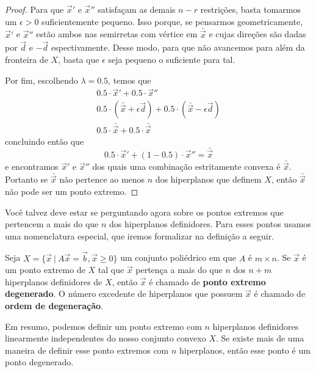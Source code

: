 \begin{thm:ponto extremo}
\begin{proof}
		Para que $\vec{x}'$ e $\vec{x}''$ satisfaçam as demais $n - r$ restrições,
		basta tomarmos um $\epsilon > 0$ suficientemente pequeno. Isso porque, se
		pensarmos geometricamente,  $\vec{x}'$ e $\vec{x}''$ estão ambos nas semirretas
		com vértice em $\bar{\vec{x}}$ e cujas direções são dadas por $\vec{d}$ e $-\vec{d}$
		espectivamente. Desse modo, para que não avancemos para além da fronteira de $X$,
		basta que $\epsilon$ seja pequeno o suficiente para tal.

		Por fim, escolhendo $\lambda = 0.5$, temos que
		\begin{gather*}
			0.5 \cdot \vec{x}' + 0.5 \cdot \vec{x}'' \\
			0.5 \cdot (\bar{\vec{x}} + \epsilon \vec{d}) +
			0.5 \cdot (\bar{\vec{x}} - \epsilon \vec{d}) \\
			0.5 \cdot \bar{\vec{x}} + 0.5 \cdot \bar{\vec{x}}
		\end{gather*}
		concluindo então que
		\begin{equation*}
			0.5 \cdot \vec{x}' + (1 - 0.5) \cdot \vec{x}'' = \bar{\vec{x}}
		\end{equation*}
		e encontramos $\vec{x}'$ e $\vec{x}''$ dos quais uma combinação estritamente
		convexa é $\bar{\vec{x}}$. Portanto se $\bar{\vec{x}}$ não pertence ao
		menos $n$ dos hiperplanos que definem $X$, então $\bar{\vec{x}}$ não
		pode ser um ponto extremo.
	\end{proof}
\end{thm:ponto extremo}

Você talvez deve estar se perguntando agora sobre os pontos extremos que pertencem a
mais do que $n$ dos hiperplanos definidores. Para esses pontos usamos uma nomenclatura
especial, que iremos formalizar na definição a seguir.

\begin{def:ponto degenerado}
	Seja $X = \{\vec{x}\ |\ A\vec{x} = \vec{b}, \vec{x} \geq 0\}$ um conjunto
	poliédrico em que $A$ é $m \times n$. Se $\vec{x}$ é um ponto extremo de $X$
	tal que $\vec{x}$ pertença a mais do que $n$ dos $n + m$ hiperplanos definidores
	de $X$, então $\vec{x}$ é chamado de \textbf{ponto extremo degenerado}. O
	número excedente de hiperplanos que possuem $\vec{x}$ é chamado de
	\textbf{ordem de degeneração}.
\end{def:ponto degenerado}

Em resumo, podemos definir um ponto extremo com $n$ hiperplanos definidores
linearmente independentes do nosso conjunto convexo $X$. Se existe mais de uma
maneira de definir esse ponto extremos com $n$ hiperplanos, então esse ponto é
um ponto degenerado.


